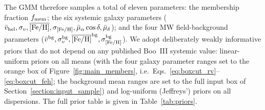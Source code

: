 \documentclass[twocolumn, apj, numberedappendix, appendixfloats]{openjournal_dhayaa}
\begin{document}
The GMM therefore samples a total of eleven parameters: the membership fraction $f_{\rm mem}$; the six systemic galaxy parameters ($\bar v_{\rm hel}, \sigma_v, \overline{[\mathrm{Fe/H}]}, \sigma_{[\mathrm{Fe/H}]}, \bar\mu_\alpha\cos\delta, \bar\mu_\delta$); and the four MW field-background parameters ($\bar v^{\rm bg}, \sigma_v^{\rm bg}, \overline{[\mathrm{Fe/H}]}^{\rm bg}, \sigma_{[\mathrm{Fe/H}]}^{\rm bg}$). We adopt deliberately weakly informative priors that do not depend on any published Boo~III systemic value: linear-uniform priors on all means (with the four galaxy parameter ranges set to the orange box of Figure~\ref{fig:main_members}, i.e.\ Eqs.~\ref{eq:boxcut_rv}--\ref{eq:boxcut_feh}; the background mean ranges are set to the full input box of Section~\ref{section:input_sample}) and log-uniform (Jeffreys') priors on all dispersions. The full prior table is given in Table~\ref{tab:priors}.




\end{document}
